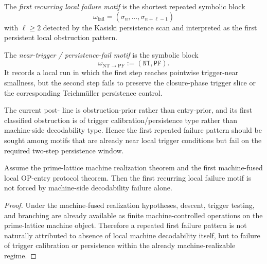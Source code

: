 \begin{definition}
\label{def:first-recurring-local-failure-motif}
The \emph{first recurring local failure motif} is the shortest repeated symbolic block
\[
\omega_{\mathrm{fail}}
=
(\sigma_n,\dots,\sigma_{n+\ell-1})
\]
with \(\ell\ge 2\) detected by the Kasiski persistence scan and interpreted as the first persistent local obstruction pattern.
\end{definition}

\begin{definition}
\label{def:near-trigger-persistence-fail-motif}
The \emph{near-trigger / persistence-fail motif} is the symbolic block
\[
\omega_{\mathrm{NT\to PF}}
:=
(\mathtt{NT},\mathtt{PF}).
\]
It records a local run in which the first step reaches pointwise trigger-near smallness, but the second step fails to preserve the closure-phase trigger slice or the corresponding Teichm\"uller persistence control.
\end{definition}

\begin{remark}
\label{rem:why-natural-first-failure-final}
The current post- line is obstruction-prior rather than entry-prior, and its first classified obstruction is of trigger calibration/persistence type rather than machine-side decodability type.
Hence the first repeated failure pattern should be sought among motifs that are already near local trigger conditions but fail on the required two-step persistence window.
\end{remark}

\begin{proposition}
\label{prop:machine-side-decodability-not-first-recurring-failure-source}
Assume the prime-lattice machine realization theorem and the first machine-fused local OP-entry protocol theorem.
Then the first recurring local failure motif is not forced by machine-side decodability failure alone.
\end{proposition}

\begin{proof}
Under the machine-fused realization hypotheses, descent, trigger testing, and branching are already available as finite machine-controlled operations on the prime-lattice machine object.
Therefore a repeated first failure pattern is not naturally attributed to absence of local machine decodability itself, but to failure of trigger calibration or persistence within the already machine-realizable regime.
\end{proof}

